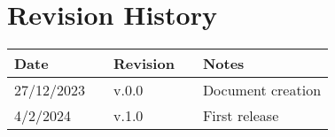 \chapter*{Revision History}

\begin{table}[h]
    \centering
    \begin{tabular}{l p{2.5cm} l p{2.5cm} l}
        \hline
        \textbf{Date} &  & \textbf{Revision} &  & \textbf{Notes}    \\ \hline
        27/12/2023    &  & v.0.0             &  & Document creation \\
        4/2/2024      &  & v.1.0             &  & First release     \\ \hline
    \end{tabular}
\end{table}

\newpage